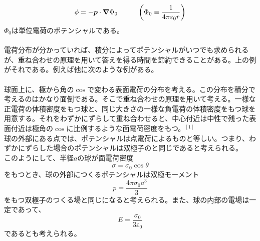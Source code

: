 \documentclass{jsarticle}
\begin{document}
\begin{equation}
\phi=-\bm{p}\cdot\bm{\nabla}\Phi_{0}\hspace{10mm}\left(\Phi_{0}\equiv\frac{1}{4\pi\varepsilon_{0}r}\right)
\end{equation}
\(\Phi_{0}\)は単位電荷のポテンシャルである。\\
\\
電荷分布が分かっていれば、積分によってポテンシャルがいつでも求められるが、重ね合わせの原理を用いて答えを得る時間を節約できることがある。上の例がそれである。例えば他に次のような例がある。\\
\\
球面上に、極から角の\(\cos\)で変わる表面電荷の分布を考える。この分布を積分で考えるのはかなり面倒である。そこで重ね合わせの原理を用いて考える。一様な正電荷の体積密度をもつ球と、同じ大きさの一様な負電荷の体積密度をもつ球を用意する。それをわずかにずらして重ね合わせると、中心付近は中性で残った表面付近は極角の\(\cos\)に比例するような面電荷密度をもつ。\(^{[1]}\)\\
球の外部にある点では、ポテンシャルは点電荷によるものと等しい。つまり、わずかにずらした場合のポテンシャルは双極子のと同じであると考えられる。\\
このようにして、半径\(a\)の球が面電荷密度
\[\sigma=\sigma_{0}\cos\theta\]
をもつとき、球の外部につくるポテンシャルは双極モーメント
\[p=\frac{4\pi\sigma_{0}a^{3}}{3}\]
をもつ双極子のつくる場と同じになると考えられる。また、球の内部の電場は一定であって、
\[E=\frac{\sigma_{0}}{3\varepsilon_{0}}\]
であるとも考えられる。
\end{document}
